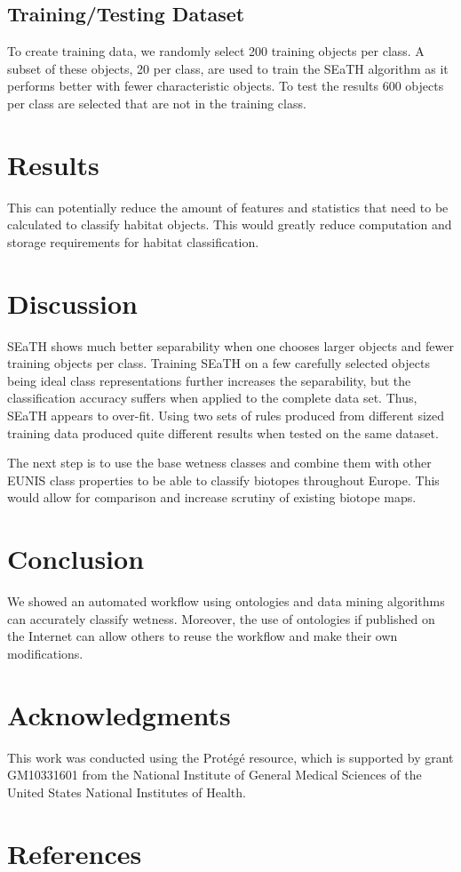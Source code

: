 \documentclass[authoryear, review,12pt,number]{elsarticle}
\begin{document}
\subsection{Training/Testing Dataset}
To create training data, we randomly select 200 training objects per class. A
subset of these objects, 20 per class, are used to train the SEaTH
algorithm as it performs better with fewer characteristic objects. To test the 
results 600 objects per class are selected that are not in the training class.

\section{Results}
This can potentially reduce the amount of features
and statistics that need to be calculated to classify habitat objects. This
would greatly reduce computation and storage requirements for habitat
classification.
\section{Discussion}
SEaTH shows much better separability when one chooses larger objects and fewer
training objects per class. Training SEaTH on a few carefully selected objects
being ideal class representations further increases the separability, but the classification
accuracy suffers when applied to the complete data set. Thus, SEaTH appears to
over-fit. Using two sets of rules produced from different sized training data
produced quite different results when tested on the same dataset.

The next step is to use the base wetness classes and combine them with other
EUNIS class properties to be able to classify biotopes throughout Europe. This
would allow for comparison and increase scrutiny of existing biotope maps.

\section{Conclusion}
We showed an automated workflow using ontologies and data mining algorithms can
accurately classify wetness. Moreover, the use of ontologies if published on the
Internet can allow others to reuse the workflow and make their own
modifications.
\section{Acknowledgments}
This work was conducted using the Prot\'eg\'e resource, which
is supported by grant GM10331601 from the National Institute of General
Medical Sciences of the United States National Institutes of Health.

\section{References}

\end{document}
